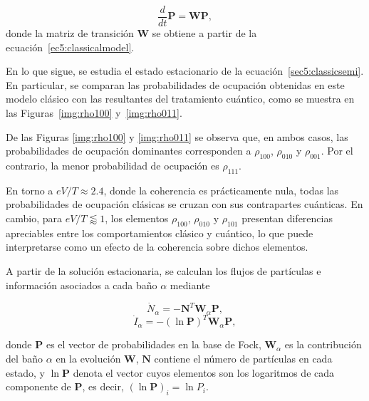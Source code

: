 \begin{equation}
    \frac{d}{dt}\textbf{P} = \textbf{W}\textbf{P},
    \label{sec5:classicsemi}
\end{equation}
donde la matriz de transición $\mathbf{W}$ se obtiene a partir de la ecuación~\eqref{ec5:classicalmodel}.

En lo que sigue, se estudia el estado estacionario de la ecuación~\eqref{sec5:classicsemi}. En particular, se comparan las probabilidades de ocupación obtenidas en este modelo clásico con las resultantes del tratamiento cuántico, como se muestra en las Figuras~\ref{img:rho100} y~\ref{img:rho011}. 


De las Figuras \ref{img:rho100} y \ref{img:rho011} se observa que, en ambos casos, las probabilidades de ocupación dominantes corresponden a $\rho_{100}$, $\rho_{010}$ y $\rho_{001}$. Por el contrario, la menor probabilidad de ocupación es $\rho_{111}$.
 
En torno a $eV/T \approx 2.4$, donde la coherencia es prácticamente nula, todas las probabilidades de ocupación clásicas se cruzan con sus contrapartes cuánticas. En cambio, para $eV/T \lessapprox 1$, los elementos $\rho_{100}$, $\rho_{010}$ y $\rho_{101}$ presentan diferencias apreciables entre los comportamientos clásico y cuántico, lo que puede interpretarse como un efecto de la coherencia sobre dichos elementos.

A partir de la solución estacionaria, se calculan los flujos de partículas e información asociados a cada baño $\alpha$ mediante

\begin{equation}
    \dot{N}_{\alpha} = -\mathbf{N}^{T} \mathbf{W}_{\alpha}\mathbf{P},
    \label{sec5:currentsemi}
\end{equation}
\begin{equation}
    \dot{I}_{\alpha} = -(\ln \mathbf{P})^{T} \mathbf{W}_{\alpha}\mathbf{P},
    \label{sec5:infosemi}
\end{equation}

donde $\mathbf{P}$ es el vector de probabilidades en la base de Fock, $\mathbf{W}_{\alpha}$ es la contribución del baño $\alpha$ en la evolución $\mathbf{W}$, $\mathbf{N}$ contiene el número de partículas en cada estado, y $\ln \mathbf{P}$ denota el vector cuyos elementos son los logaritmos de cada componente de $\mathbf{P}$, es decir, $(\ln \mathbf{P})_i = \ln P_i$\cite{monsel2025autonomous}.

